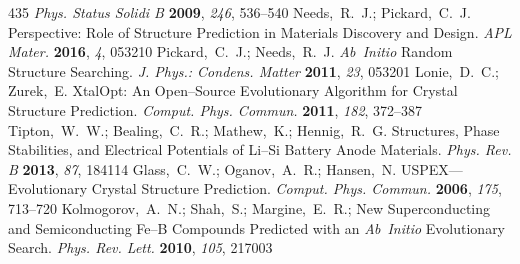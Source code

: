 \documentclass[12pt,letterpaper,oneside]{article}
\begin{document}
\begin{mcitethebibliography}{435}
  \emph{Phys. Status Solidi B} \textbf{2009}, \emph{246}, 536--540\relax
\mciteBstWouldAddEndPuncttrue
\mciteSetBstMidEndSepPunct{\mcitedefaultmidpunct}
{\mcitedefaultendpunct}{\mcitedefaultseppunct}\relax
\EndOfBibitem
{}
Needs,~R.~J.; Pickard,~C.~J. Perspective: Role of Structure Prediction in
  Materials Discovery and Design. \emph{APL Mater.} \textbf{2016}, \emph{4},
  053210\relax
\mciteBstWouldAddEndPuncttrue
\mciteSetBstMidEndSepPunct{\mcitedefaultmidpunct}
{\mcitedefaultendpunct}{\mcitedefaultseppunct}\relax
\EndOfBibitem
{}
Pickard,~C.~J.; Needs,~R.~J. \emph{Ab~Initio} Random Structure Searching. \emph{J.
  Phys.: Condens. Matter} \textbf{2011}, \emph{23}, 053201\relax
\mciteBstWouldAddEndPuncttrue
\mciteSetBstMidEndSepPunct{\mcitedefaultmidpunct}
{\mcitedefaultendpunct}{\mcitedefaultseppunct}\relax
\EndOfBibitem
{}
Lonie,~D.~C.; Zurek,~E. XtalOpt: An Open--Source Evolutionary Algorithm for
  Crystal Structure Prediction. \emph{Comput. Phys. Commun.} \textbf{2011},
  \emph{182}, 372--387\relax
\mciteBstWouldAddEndPuncttrue
\mciteSetBstMidEndSepPunct{\mcitedefaultmidpunct}
{\mcitedefaultendpunct}{\mcitedefaultseppunct}\relax
\EndOfBibitem
{}
Tipton,~W.~W.; Bealing,~C.~R.; Mathew,~K.; Hennig,~R.~G. Structures, Phase
  Stabilities, and Electrical Potentials of Li--Si Battery Anode Materials.
  \emph{Phys. Rev. B} \textbf{2013}, \emph{87}, 184114\relax
\mciteBstWouldAddEndPuncttrue
\mciteSetBstMidEndSepPunct{\mcitedefaultmidpunct}
{\mcitedefaultendpunct}{\mcitedefaultseppunct}\relax
\EndOfBibitem
{}
Glass,~C.~W.; Oganov,~A.~R.; Hansen,~N. USPEX---Evolutionary Crystal Structure
  Prediction. \emph{Comput. Phys. Commun.} \textbf{2006}, \emph{175},
  713--720\relax
\mciteBstWouldAddEndPuncttrue
\mciteSetBstMidEndSepPunct{\mcitedefaultmidpunct}
{\mcitedefaultendpunct}{\mcitedefaultseppunct}\relax
\EndOfBibitem
{}
Kolmogorov,~A.~N.; Shah,~S.; Margine,~E.~R.;
    New Superconducting and Semiconducting Fe--B Compounds
  Predicted with an \emph{Ab~Initio} Evolutionary Search. \emph{Phys. Rev. Lett.}
  \textbf{2010}, \emph{105}, 217003\relax
\mciteBstWouldAddEndPuncttrue
\mciteSetBstMidEndSepPunct{\mcitedefaultmidpunct}
{\mcitedefaultendpunct}{\mcitedefaultseppunct}\relax

\end{mcitethebibliography}
\end{document}
